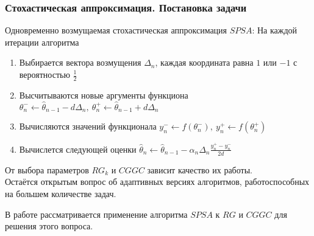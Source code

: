 \begin{frame}
	\frametitle{Стохастическая аппроксимация. Постановка задачи}
	Одновременно возмущаемая стохастическая аппроксимация $SPSA$:
	На каждой итерации алгоритма
	\begin{enumerate}
		\item Выбирается вектора возмущения $\Delta_n$, каждая координата равна $1$ или $-1$ с вероятностью $\frac{1}{2}$
		\item Высчитываются новые аргументы функциона 
		$\theta_{n}^{-} \leftarrow \hat{\theta}_{n - 1} - d\Delta_{n},\ \theta_{n}^{+} \leftarrow \hat{\theta}_{n - 1} + d\Delta_{n}$
		\item Вычисляются значений функционала $y_n^{-} \leftarrow f(\theta_{n}^{-}),\ y_n^{+} \leftarrow f(\theta_{n}^{+})$
		\item Вычислется следующей оценки $\hat{\theta}_n \leftarrow \hat{\theta}_{n - 1} - \alpha_n \Delta_{n} \frac{y_n^{+} - y_n^{-}}{2d}$
	\end{enumerate}

	От выбора параметров $RG_k$ и $CGGC$ зависит качество их работы.\\
	Остаётся открытым вопрос об адаптивных версиях алгоритмов, работоспособных на большем количестве задач.\vspace{.5em}

	В работе рассматривается применение алгоритма $SPSA$ к $RG$ и $CGGC$ для решения этого вопроса.
\end{frame}


